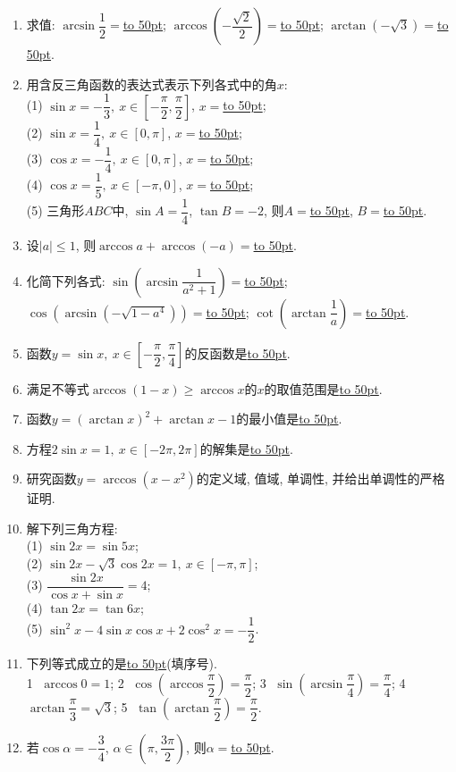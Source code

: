 \documentclass[10pt,a4paper]{article}
\newcommand{\blank}[1]{\underline{\hbox to #1pt{}}}
\begin{document}
\begin{enumerate}[1.]
\item 求值: $\arcsin\dfrac 12=$\blank{50}; $\arccos(-\dfrac{\sqrt 2}2)=$\blank{50}; $\arctan(-\sqrt 3)=$\blank{50}.
\item 用含反三角函数的表达式表示下列各式中的角$x$:\\
(1) $\sin x=-\dfrac 13, \ x\in [-\dfrac{\pi}2,\dfrac{\pi}2]$, $x=$\blank{50};\\
(2) $\sin x=\dfrac 14, \ x\in [0,\pi]$, $x=$\blank{50};\\
(3) $\cos x=-\dfrac 14, \ x\in [0,\pi]$, $x=$\blank{50};\\ 
(4) $\cos x=\dfrac 15, \ x\in [-\pi,0]$, $x=$\blank{50};\\
(5) 三角形$ABC$中, $\sin A=\dfrac 14$, $\tan B=-2$, 则$A=$\blank{50}, $B=$\blank{50}.
\item 设$|a|\le 1$, 则$\arccos a+\arccos(-a)=$\blank{50}.
\item 化简下列各式: $\sin(\arcsin\dfrac 1{a^2+1})=$\blank{50}; $\cos(\arcsin(-\sqrt{1-a^4}))=$\blank{50}; $\cot(\arctan\dfrac 1a)=$\blank{50}.
\item 函数$y=\sin x, \ x\in [-\dfrac{\pi}2,\dfrac{\pi}4]$的反函数是\blank{50}.
\item 满足不等式$\arccos(1-x)\ge \arccos x$的$x$的取值范围是\blank{50}.
\item 函数$y=(\arctan x)^2+\arctan x-1$的最小值是\blank{50}.
\item 方程$2\sin x=1, \ x\in [-2\pi,2\pi]$的解集是\blank{50}.
\item 研究函数$y=\arccos(x-x^2)$的定义域, 值域, 单调性, 并给出单调性的严格证明.
\item 解下列三角方程:\\
(1) $\sin 2x=\sin 5x$;\\
(2) $\sin 2x-\sqrt 3\cos 2x=1, \ x\in [-\pi,\pi]$;\\
(3) $\dfrac{\sin 2x}{\cos x+\sin x}=4$;\\
(4) $\tan 2x=\tan 6x$;\\
(5) $\sin^2 x-4\sin x\cos x+2\cos^2 x=-\dfrac 12$.
\item 下列等式成立的是\blank{50}(填序号).\\
\textcircled{1} $\arccos 0=1$; \textcircled{2} $\cos(\arccos \dfrac{\pi}2)=\dfrac{\pi}2$; \textcircled{3} $\sin(\arcsin\dfrac{\pi}4)=\dfrac{\pi}4$; 
\textcircled{4} $\arctan\dfrac{\pi}3=\sqrt 3$; \textcircled{5} $\tan(\arctan\dfrac{\pi}2)=\dfrac{\pi}2$.
\item 若$\cos\alpha=-\dfrac 34$, $\alpha\in (\pi,\dfrac{3\pi}2)$, 则$\alpha=$\blank{50}.

\end{enumerate}
\end{document}
